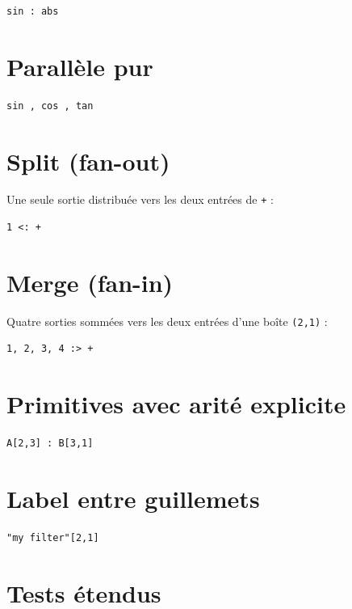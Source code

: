 \documentclass[11pt,a4paper]{article}
\theoremstyle{definition}
\begin{document}
\begin{lstlisting}
sin : abs
\end{lstlisting}


\section{Parallèle pur}

\begin{lstlisting}
sin , cos , tan
\end{lstlisting}


\section{Split (fan-out)}

Une seule sortie distribuée vers les deux entrées de \texttt{+} :


\begin{lstlisting}
1 <: +
\end{lstlisting}


\section{Merge (fan-in)}

Quatre sorties sommées vers les deux entrées d'une boîte \texttt{(2,1)} :


\begin{lstlisting}
1, 2, 3, 4 :> +
\end{lstlisting}


\section{Primitives avec arité explicite}

\begin{lstlisting}
A[2,3] : B[3,1]
\end{lstlisting}


\section{Label entre guillemets}

\begin{lstlisting}
"my filter"[2,1]
\end{lstlisting}


\section{Tests étendus}
\end{document}
